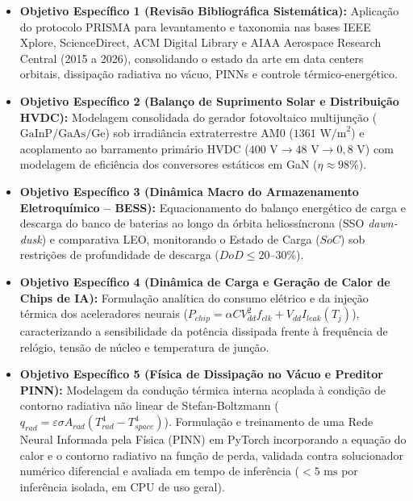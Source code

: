 \begin{itemize}[leftmargin=*]
    \item \textbf{Objetivo Específico 1 (Revisão Bibliográfica Sistemática):} Aplicação do protocolo PRISMA para levantamento e taxonomia nas bases IEEE Xplore, ScienceDirect, ACM Digital Library e AIAA Aerospace Research Central (2015 a 2026), consolidando o estado da arte em data centers orbitais, dissipação radiativa no vácuo, PINNs e controle térmico-energético.
    
    \item \textbf{Objetivo Específico 2 (Balanço de Suprimento Solar e Distribuição HVDC):} Modelagem consolidada do gerador fotovoltaico multijunção ($\text{GaInP}/\text{GaAs}/\text{Ge}$) sob irradiância extraterrestre AM0 ($1361\text{ W/m}^2$) e acoplamento ao barramento primário HVDC ($400\text{ V} \rightarrow 48\text{ V} \rightarrow 0{,}8\text{ V}$) com modelagem de eficiência dos conversores estáticos em GaN ($\eta \approx 98\%$).
    
    \item \textbf{Objetivo Específico 3 (Dinâmica Macro do Armazenamento Eletroquímico -- BESS):} Equacionamento do balanço energético de carga e descarga do banco de baterias ao longo da órbita heliossíncrona (SSO \textit{dawn-dusk}) e comparativa LEO, monitorando o Estado de Carga ($SoC$) sob restrições de profundidade de descarga ($DoD \le 20\text{--}30\%$).
    
    \item \textbf{Objetivo Específico 4 (Dinâmica de Carga e Geração de Calor de Chips de IA):} Formulação analítica do consumo elétrico e da injeção térmica dos aceleradores neurais ($P_{chip} = \alpha C V_{dd}^2 f_{clk} + V_{dd} I_{leak}(T_j)$), caracterizando a sensibilidade da potência dissipada frente à frequência de relógio, tensão de núcleo e temperatura de junção.
    
    \item \textbf{Objetivo Específico 5 (Física de Dissipação no Vácuo e Preditor PINN):} Modelagem da condução térmica interna acoplada à condição de contorno radiativa não linear de Stefan-Boltzmann ($q_{rad} = \varepsilon \sigma A_{rad} (T_{rad}^4 - T_{space}^4)$). Formulação e treinamento de uma Rede Neural Informada pela Física (PINN) em PyTorch incorporando a equação do calor e o contorno radiativo na função de perda, validada contra solucionador numérico diferencial e avaliada em tempo de inferência ($< 5\text{ ms}$ por inferência isolada, em CPU de uso geral).
    

\end{itemize}
